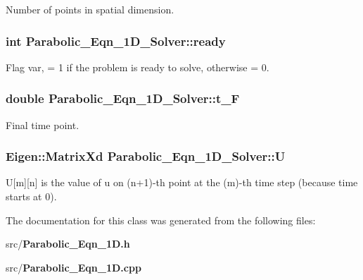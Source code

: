 Number of points in spatial dimension. 

\subsubsection{\setlength{\rightskip}{0pt plus 5cm}int \bf{Parabolic\_\-Eqn\_\-1D\_\-Solver::ready}}\label{classParabolic__Eqn__1D__Solver_1bc8bde2520169d82cf5b7a729e46c6b}


Flag var, = 1 if the problem is ready to solve, otherwise = 0. 

\subsubsection{\setlength{\rightskip}{0pt plus 5cm}double \bf{Parabolic\_\-Eqn\_\-1D\_\-Solver::t\_\-F}}\label{classParabolic__Eqn__1D__Solver_bab464d3a381d40cbb6309890334f83a}


Final time point. 

\subsubsection{\setlength{\rightskip}{0pt plus 5cm}Eigen::Matrix\-Xd \bf{Parabolic\_\-Eqn\_\-1D\_\-Solver::U}}\label{classParabolic__Eqn__1D__Solver_0306c84a031702519a27d4801becaabb}


U[m][n] is the value of u on (n+1)-th point at the (m)-th time step (because time starts at 0). 



The documentation for this class was generated from the following files:\begin{CompactItemize}
\item 
src/\bf{Parabolic\_\-Eqn\_\-1D.h}\item 
src/\bf{Parabolic\_\-Eqn\_\-1D.cpp}\end{CompactItemize}
